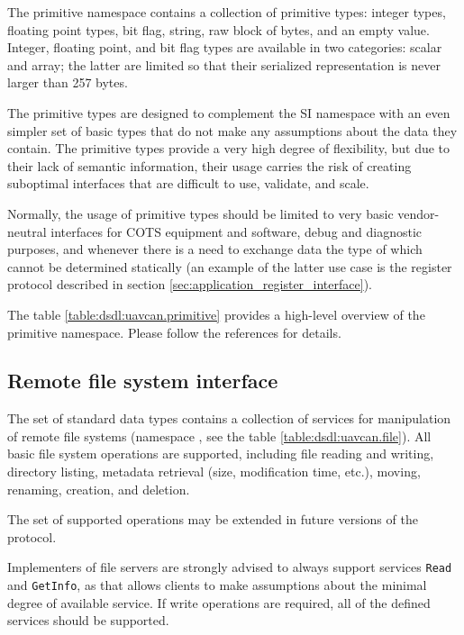 The primitive namespace contains a collection of primitive types:
integer types, floating point types, bit flag, string, raw block of bytes, and an empty value.
Integer, floating point, and bit flag types are available in two categories: scalar and array;
the latter are limited so that their serialized representation is never larger than 257 bytes.

The primitive types are designed to complement the SI namespace with an even simpler set of basic types
that do not make any assumptions about the data they contain.
The primitive types provide a very high degree of flexibility,
but due to their lack of semantic information,
their usage carries the risk of creating suboptimal interfaces that are difficult to use, validate, and scale.

Normally, the usage of primitive types should be limited to very basic vendor-neutral interfaces for COTS
equipment and software, debug and diagnostic purposes, and whenever there is a need to exchange data the
type of which cannot be determined statically (an example of the latter use case is the register protocol
described in section \ref{sec:application_register_interface}).

The table \ref{table:dsdl:uavcan.primitive} provides a high-level overview of the primitive namespace.
Please follow the references for details.


\subsection{Remote file system interface}\label{sec:application_file_system}

The set of standard data types contains a collection of services for manipulation of remote file systems
(namespace , see the table \ref{table:dsdl:uavcan.file}).
All basic file system operations are supported, including file reading and writing,
directory listing, metadata retrieval (size, modification time, etc.), moving, renaming, creation, and deletion.

The set of supported operations may be extended in future versions of the protocol.

Implementers of file servers are strongly advised to always support services \verb|Read| and \verb|GetInfo|,
as that allows clients to make assumptions about the minimal degree of available service.
If write operations are required, all of the defined services should be supported.

